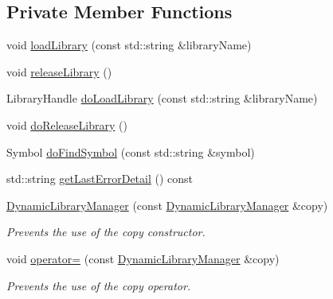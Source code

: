 \subsection*{Private Member Functions}
\begin{DoxyCompactItemize}
\item 
void \hyperlink{class_dynamic_library_manager_a3e2819996f45c124253810a2dc624709}{load\+Library} (const std\+::string \&library\+Name)
\item 
void \hyperlink{class_dynamic_library_manager_a3bb952ae43103fe9ea0b83c693210ebf}{release\+Library} ()
\item 
Library\+Handle \hyperlink{class_dynamic_library_manager_adf9585fc8f3284df5471d1c5e04a105d}{do\+Load\+Library} (const std\+::string \&library\+Name)
\item 
void \hyperlink{class_dynamic_library_manager_a99b554dad3fe8b84de3e8b443d5a7ca0}{do\+Release\+Library} ()
\item 
Symbol \hyperlink{class_dynamic_library_manager_ac3079091cf970cc285216a27e13cff44}{do\+Find\+Symbol} (const std\+::string \&symbol)
\item 
std\+::string \hyperlink{class_dynamic_library_manager_a87b5efd7125dfe24c23d8c7e2a002d07}{get\+Last\+Error\+Detail} () const 
\item 
\hyperlink{class_dynamic_library_manager_ac313ca179746d416e2b634501e2c294b}{Dynamic\+Library\+Manager} (const \hyperlink{class_dynamic_library_manager}{Dynamic\+Library\+Manager} \&copy)\hypertarget{class_dynamic_library_manager_ac313ca179746d416e2b634501e2c294b}{}\label{class_dynamic_library_manager_ac313ca179746d416e2b634501e2c294b}

\begin{DoxyCompactList}\small\item\em Prevents the use of the copy constructor. \end{DoxyCompactList}\item 
void \hyperlink{class_dynamic_library_manager_ab9877291e4fa30145c10b1d328797c31}{operator=} (const \hyperlink{class_dynamic_library_manager}{Dynamic\+Library\+Manager} \&copy)\hypertarget{class_dynamic_library_manager_ab9877291e4fa30145c10b1d328797c31}{}\label{class_dynamic_library_manager_ab9877291e4fa30145c10b1d328797c31}

\begin{DoxyCompactList}\small\item\em Prevents the use of the copy operator. \end{DoxyCompactList}\end{DoxyCompactItemize}
